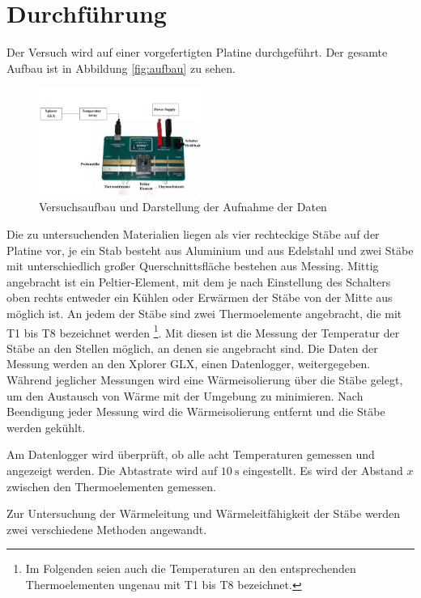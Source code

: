 \section{Durchführung}
\label{sec:Durchführung}
Der Versuch wird auf einer vorgefertigten Platine durchgeführt. Der gesamte Aufbau
ist in Abbildung \ref{fig:aufbau} zu sehen.

\begin{figure}
  \centering
  \includegraphics[width=150pt]{data/aufbau.png}
  \caption{Versuchsaufbau und Darstellung der Aufnahme der Daten \cite{Versuchsanleitung}}
  \label{fig:schaltbild1}
\end{figure}

Die zu untersuchenden Materialien liegen als vier rechteckige Stäbe auf der Platine vor,
je ein Stab besteht aus Aluminium und aus Edelstahl und zwei Stäbe mit unterschiedlich
großer Querschnittsfläche bestehen aus Messing. Mittig angebracht ist ein Peltier-Element,
mit dem je nach Einstellung des Schalters oben rechts entweder ein Kühlen oder
Erwärmen der Stäbe von der Mitte aus möglich ist. An jedem der Stäbe sind zwei
Thermoelemente angebracht, die mit T1 bis T8 bezeichnet werden
\footnote{Im Folgenden seien auch die Temperaturen an den entsprechenden Thermoelementen ungenau mit T1 bis T8 bezeichnet.}.
Mit diesen ist die Messung der Temperatur der Stäbe an den Stellen möglich,
an denen sie angebracht sind. Die Daten der Messung werden an den Xplorer GLX, einen Datenlogger, weitergegeben.
Während jeglicher Messungen wird eine Wärmeisolierung über die Stäbe gelegt, um
den Austausch von Wärme mit der Umgebung zu minimieren. Nach Beendigung jeder Messung
wird die Wärmeisolierung entfernt und die Stäbe werden gekühlt.

Am Datenlogger wird überprüft, ob alle acht Temperaturen gemessen und angezeigt werden.
Die Abtastrate wird auf $\SI{10}{\second}$ eingestellt.
Es wird der Abstand $x$ zwischen den Thermoelementen gemessen.

Zur Untersuchung der Wärmeleitung und Wärmeleitfähigkeit der Stäbe werden zwei
verschiedene Methoden angewandt.


